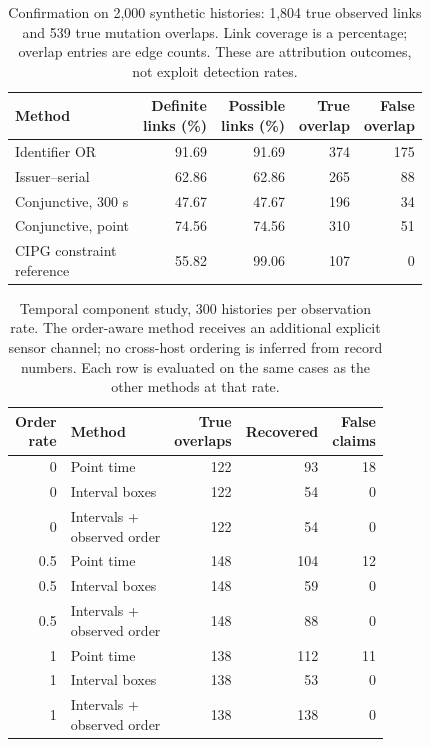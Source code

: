 \begin{table}[tbp]
\centering
\caption{Confirmation on 2,000 synthetic histories: 1,804 true observed links and 539 true mutation overlaps. Link coverage is a percentage; overlap entries are edge counts. These are attribution outcomes, not exploit detection rates.}
\label{tab:lineage_confirmation}
\evidencetable
\begin{tabular}{lrrrr}
\toprule
Method & \makecell{Definite\\links (\%)} & \makecell{Possible\\links (\%)} & \makecell{True\\overlap} & \makecell{False\\overlap} \\
\midrule
Identifier OR & 91.69 & 91.69 & 374 & 175 \\
Issuer--serial & 62.86 & 62.86 & 265 & 88 \\
Conjunctive, 300 s & 47.67 & 47.67 & 196 & 34 \\
Conjunctive, point & 74.56 & 74.56 & 310 & 51 \\
\makecell[l]{CIPG constraint\\reference} & 55.82 & 99.06 & 107 & 0 \\
\bottomrule
\end{tabular}
\end{table}
\begin{table}[tbp]
\centering
\caption{Temporal component study, 300 histories per observation rate. The order-aware method receives an additional explicit sensor channel; no cross-host ordering is inferred from record numbers. Each row is evaluated on the same cases as the other methods at that rate.}
\label{tab:order_component}
\evidencetable
\begin{tabular}{rlrrr}
\toprule
\makecell{Order\\rate} & Method & \makecell{True\\overlaps} & Recovered & \makecell{False\\claims} \\
\midrule
0 & Point time & 122 & 93 & 18 \\
0 & Interval boxes & 122 & 54 & 0 \\
0 & \makecell[l]{Intervals +\\observed order} & 122 & 54 & 0 \\
0.5 & Point time & 148 & 104 & 12 \\
0.5 & Interval boxes & 148 & 59 & 0 \\
0.5 & \makecell[l]{Intervals +\\observed order} & 148 & 88 & 0 \\
1 & Point time & 138 & 112 & 11 \\
1 & Interval boxes & 138 & 53 & 0 \\
1 & \makecell[l]{Intervals +\\observed order} & 138 & 138 & 0 \\
\bottomrule
\end{tabular}
\end{table}
